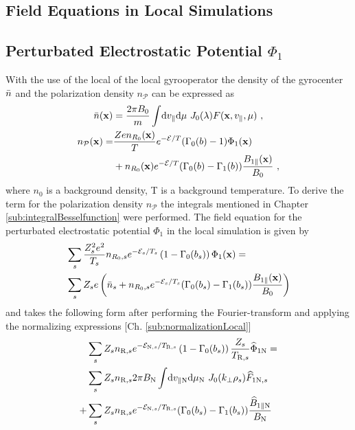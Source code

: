 \subsection{Field Equations in Local Simulations}
\label{sub:fieldLocal}

\subsection*{Perturbated Electrostatic Potential $\Phi_1$}
\label{sub:fieldPotentialLocal}

With the use of the local of the local gyrooperator the density of the gyrocenter $\bar{n}$ and the polarization density $n_\mathcal{P}$ can be expressed as
\begin{gather}
	\bar{n}(\boldsymbol{\mathbf{x}}) = \frac{2\pi B_0}{m} \int \! \mathrm{d}v_\parallel\mathrm{d}\mu ~ J_0(\lambda) F(\boldsymbol{\mathbf{x}}, v_\parallel, \mu)~, \\
    \begin{aligned}
	    n_\mathcal{P}(\boldsymbol{\mathbf{x}}) = &\frac{Ze n_{R_0}(\boldsymbol{\mathbf{x}})}{T} e^{-\mathcal{E}/T} (\Gamma_0(b) - 1) \Phi_1(\boldsymbol{\mathbf{x}}) \\
                            &+ n_{R_0}(\boldsymbol{\mathbf{x}}) e^{-\mathcal{E}/T} (\Gamma_0(b) - \Gamma_1(b))\frac{B_{1\parallel}(\boldsymbol{\mathbf{x}})}{B_0}~,
    \end{aligned}
	\label{eq:particleDensityLocal}
\end{gather}
where $n_0$ is a background density, T is a background temperature. To derive the term for the polarization density $n_\mathcal{P}$ the integrals mentioned in Chapter \ref{sub:integralBesselfunction} were performed. The field equation for the perturbated electrostatic potential $\Phi_1$ in the local simulation is given by
\begin{gather}
    \begin{aligned}
        &\sum_s \frac{Z_s^2e^2}{T_s} n_{R_0,s} e^{-\mathcal{E}_s/T_s} \left(1 - \Gamma_0(b_s)\right) \Phi_1(\boldsymbol{\mathbf{x}}) = \\
        &\sum_s Z_se \left(\bar{n}_s + n_{R_0,s} e^{-\mathcal{E}_s/T_s} (\Gamma_0(b_s) - \Gamma_1(b_s))\frac{B_{1\parallel}(\boldsymbol{\mathbf{x}})}{B_0} \right)
        \label{eq:fieldPotentialLocal}
    \end{aligned}
\end{gather}
and takes the following form after performing the Fourier-transform and applying the normalizing expressions [Ch. \ref{sub:normalizationLocal}]
\begin{gather}
    \begin{aligned}
        &\sum_s Z_s n_{\mathrm{R},s} e^{-\mathcal{E}_{\mathrm{N},s}/T_{\mathrm{R},s}} \left(1 - \Gamma_0(b_s)\right) \frac{Z_s}{T_{\mathrm{R},s}} \widehat{\Phi}_{1 \mathrm{N}} = \\
        &\sum_s Z_sn_{\mathrm{R},s} 2\pi B_\mathrm{N} \int \! \mathrm{d}v_{\parallel \mathrm{N}} \mathrm{d}\mu_\mathrm{N} ~ J_0(k_\perp \rho_s) \widehat{F}_{1\mathrm{N},s} \\
        + & \sum_s Z_sn_{\mathrm{R},s} e^{-\mathcal{E}_{\mathrm{N},s}/T_{\mathrm{R},s}} (\Gamma_0(b_s) - \Gamma_1(b_s))\frac{\widehat{B}_{1\parallel \mathrm{N}}}{B_\mathrm{N}}
        \label{eq:fieldPotentialLocalNorm}
    \end{aligned}
\end{gather}


